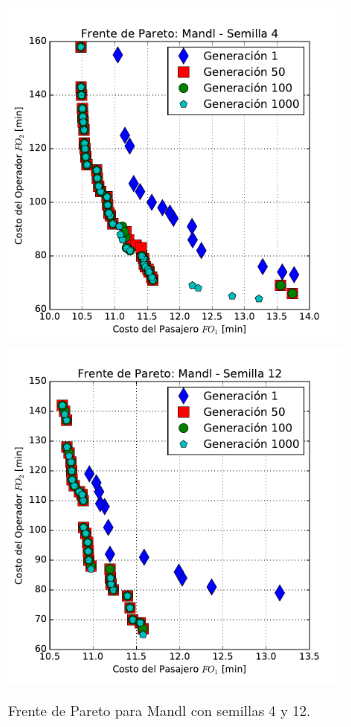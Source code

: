 \begin{figure}[p]
\centering
\includegraphics[width=0.79\textwidth]{img/frente_Mandl_s4}
\includegraphics[width=0.79\textwidth]{img/frente_Mandl_s12}
\caption{Frente de Pareto para Mandl con semillas 4 y 12.}
\label{fig:paretoMandl1}
\end{figure}

